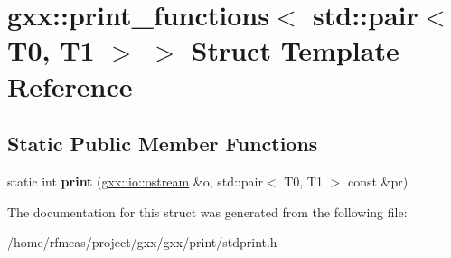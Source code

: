 \hypertarget{structgxx_1_1print__functions_3_01std_1_1pair_3_01T0_00_01T1_01_4_01_4}{}\section{gxx\+:\+:print\+\_\+functions$<$ std\+:\+:pair$<$ T0, T1 $>$ $>$ Struct Template Reference}
\label{structgxx_1_1print__functions_3_01std_1_1pair_3_01T0_00_01T1_01_4_01_4}
\subsection*{Static Public Member Functions}
\begin{DoxyCompactItemize}
\item 
static int {\bfseries print} (\hyperlink{classgxx_1_1io_1_1ostream}{gxx\+::io\+::ostream} \&o, std\+::pair$<$ T0, T1 $>$ const \&pr)\hypertarget{structgxx_1_1print__functions_3_01std_1_1pair_3_01T0_00_01T1_01_4_01_4_acabc461de57233b7516dc01a2145ebda}{}\label{structgxx_1_1print__functions_3_01std_1_1pair_3_01T0_00_01T1_01_4_01_4_acabc461de57233b7516dc01a2145ebda}

\end{DoxyCompactItemize}


The documentation for this struct was generated from the following file\+:\begin{DoxyCompactItemize}
\item 
/home/rfmeas/project/gxx/gxx/print/stdprint.\+h\end{DoxyCompactItemize}
